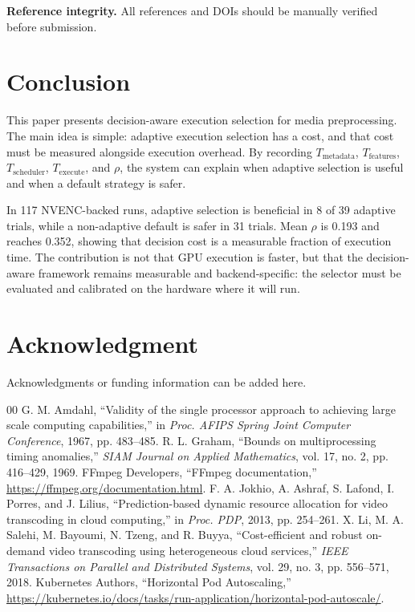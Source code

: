 \documentclass[conference]{IEEEtran}
\newcommand{\MeanRho}{0.193}
\newcommand{\MaxRho}{0.352}
\newcommand{\BeneficialCount}{8}
\newcommand{\DefaultSaferCount}{31}
\newcommand{\RunCount}{117}
\begin{document}
\textbf{Reference integrity.}
All references and DOIs should be manually verified before submission.

\section{Conclusion}

This paper presents decision-aware execution selection for media preprocessing.
The main idea is simple: adaptive execution selection has a cost, and that cost must be measured alongside execution overhead.
By recording $T_{\mathrm{metadata}}$, $T_{\mathrm{features}}$, $T_{\mathrm{scheduler}}$, $T_{\mathrm{execute}}$, and $\rho$, the system can explain when adaptive selection is useful and when a default strategy is safer.

In \RunCount{} NVENC-backed runs, adaptive selection is beneficial in \BeneficialCount{} of 39 adaptive trials, while a non-adaptive default is safer in \DefaultSaferCount{} trials.
Mean $\rho$ is \MeanRho{} and reaches \MaxRho{}, showing that decision cost is a measurable fraction of execution time.
The contribution is not that GPU execution is faster, but that the decision-aware framework remains measurable and backend-specific: the selector must be evaluated and calibrated on the hardware where it will run.

\section*{Acknowledgment}
Acknowledgments or funding information can be added here.

\begin{thebibliography}{00}
 G. M. Amdahl, ``Validity of the single processor approach to achieving large scale computing capabilities,'' in \emph{Proc. AFIPS Spring Joint Computer Conference}, 1967, pp. 483--485.
 R. L. Graham, ``Bounds on multiprocessing timing anomalies,'' \emph{SIAM Journal on Applied Mathematics}, vol. 17, no. 2, pp. 416--429, 1969.
 FFmpeg Developers, ``FFmpeg documentation,'' \url{https://ffmpeg.org/documentation.html}.
 F. A. Jokhio, A. Ashraf, S. Lafond, I. Porres, and J. Lilius, ``Prediction-based dynamic resource allocation for video transcoding in cloud computing,'' in \emph{Proc. PDP}, 2013, pp. 254--261.
 X. Li, M. A. Salehi, M. Bayoumi, N. Tzeng, and R. Buyya, ``Cost-efficient and robust on-demand video transcoding using heterogeneous cloud services,'' \emph{IEEE Transactions on Parallel and Distributed Systems}, vol. 29, no. 3, pp. 556--571, 2018.
 Kubernetes Authors, ``Horizontal Pod Autoscaling,'' \url{https://kubernetes.io/docs/tasks/run-application/horizontal-pod-autoscale/}.
\end{thebibliography}
\end{document}
